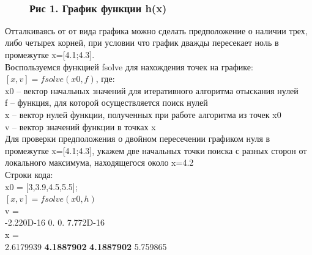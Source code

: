 \documentclass[russian,utf8,nocolumnxxxi,nocolumnxxxii]{eskdtext}
\begin{document}
\begin{figure}[H]
\begin{center}
\begin{minipage}[h]{0.65\linewidth}
  \\
\frametitle{ Рис 1. График функции h(x)}
\end{minipage}
\end{center}
\end{figure}

Отталкиваясь от от вида графика можно сделать предположение о наличии трех, либо четырех корней, при условии что график дважды пересекает ноль в промежутке x=[4.1;4.3].\\
Воспользуемся функцией fsolve для нахождения точек на графике:\\
$[x,v] = fsolve(x0,f)$, где:\\
x0 – вектор начальных значений для итеративного алгоритма отыскания нулей\\
f – функция, для которой осуществляется поиск нулей\\
x – вектор нулей функции, полученных при работе алгоритма из точек x0\\
v – вектор значений функции в точках x\\
Для проверки предположения о двойном пересечении графиком нуля в промежутке x=[4.1;4.3], укажем две начальных точки поиска с разных сторон от локального максимума, находящегося около x=4.2\\
Строки кода:\\
x0 = [3,3.9,4.5,5.5];\\
$[x,v] = fsolve(x0,h)$\\
v =\\
-2.220D-16 0. 0. 7.772D-16\\
x =\\
2.6179939 {\bf4.1887902} {\bf4.1887902} 5.759865
\end{document}
